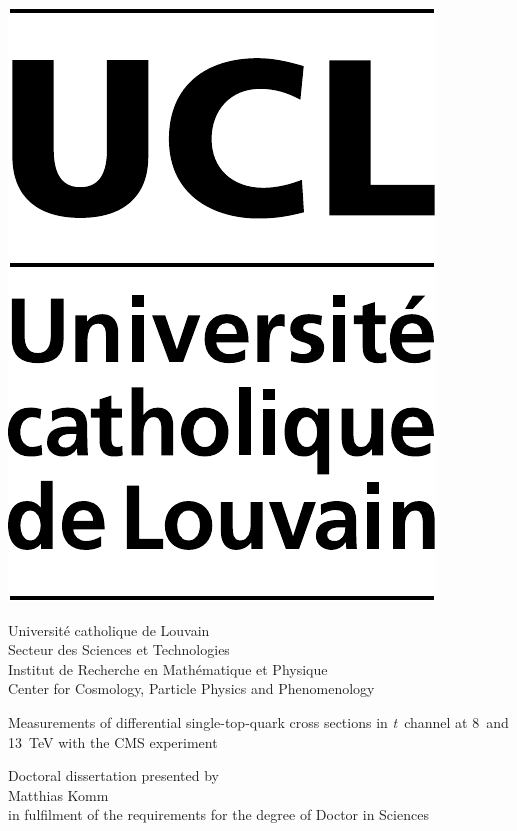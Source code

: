 \begin{clearedpagestyle}

\vspace*{0.5cm}

\parbox[c][][c]{0.2\textwidth}{
\includegraphics[height=2.cm]{figures/title/UCL.pdf}
}\parbox[c][][c]{0.799\textwidth}{\vspace{0.05cm}
\begin{flushright}
\large Universit{\'e} catholique de Louvain\\[0.25\baselineskip]
\normalsize Secteur des Sciences et Technologies\\[0.15\baselineskip] 
Institut de Recherche en Math{\'e}matique et Physique\\[0.15\baselineskip]
Center for Cosmology, Particle Physics and Phenomenology
\end{flushright}
}

\vspace{1.5cm}

\begin{center}

\vspace{0.3cm}

\parbox{0.95\textwidth}{
\fontsize{18}{25}\selectfont\centering
\textsf{Measurements of differential single-top-quark cross sections in {\it t}~channel at 8~and 13~TeV with the CMS experiment}
}

\vspace{0.3cm}

\end{center}
\vspace{0.6cm}

\begin{center}
Doctoral dissertation presented by \\
\vspace{2mm}
{\Large Matthias Komm}\\
\vspace{2mm}
in fulfilment of the requirements for the degree of Doctor in Sciences
\end{center}

\vspace{\fill}


\end{clearedpagestyle}
